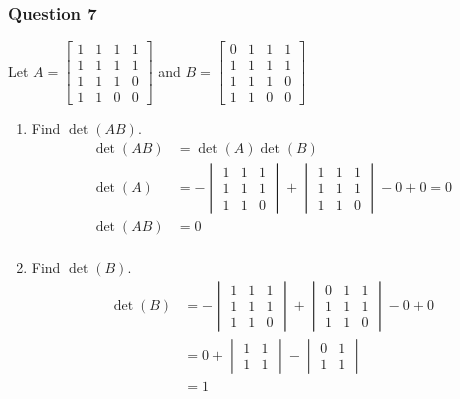 \documentclass{math}
\begin{document}
\subsubsection*{Question 7}
Let \( A = \begin{bmatrix}
  1 & 1 & 1 & 1 \\
  1 & 1 & 1 & 1 \\
  1 & 1 & 1 & 0 \\
  1 & 1 & 0 & 0
\end{bmatrix} \) and \( B = \begin{bmatrix}
  0 & 1 & 1 & 1 \\
  1 & 1 & 1 & 1 \\
  1 & 1 & 1 & 0 \\
  1 & 1 & 0 & 0
\end{bmatrix} \)
\begin{enumerate}
  \item Find \( \det(AB) \).
  \begin{align*}
    \det(AB) &= \det(A)\det(B) \\
    \det(A) &= -\begin{vmatrix}
      1 & 1 & 1 \\
      1 & 1 & 1 \\
      1 & 1 & 0
    \end{vmatrix}+\begin{vmatrix}
      1 & 1 & 1 \\
      1 & 1 & 1 \\
      1 & 1 & 0
    \end{vmatrix}-0+0 = 0 \\
    \det(AB) &= 0 \\
  \end{align*}
  \item Find \( \det(B) \).
  \begin{align*}
    \det(B) &= -\begin{vmatrix}
      1 & 1 & 1 \\
      1 & 1 & 1 \\
      1 & 1 & 0
    \end{vmatrix}+\begin{vmatrix}
      0 & 1 & 1 \\
      1 & 1 & 1 \\
      1 & 1 & 0
    \end{vmatrix}-0+0 \\
    &= 0+\begin{vmatrix}
      1 & 1 \\ 1 & 1
    \end{vmatrix}-\begin{vmatrix}
      0 & 1 \\ 1 & 1
    \end{vmatrix} \\
    &= 1
  \end{align*}
\end{enumerate}
\end{document}
